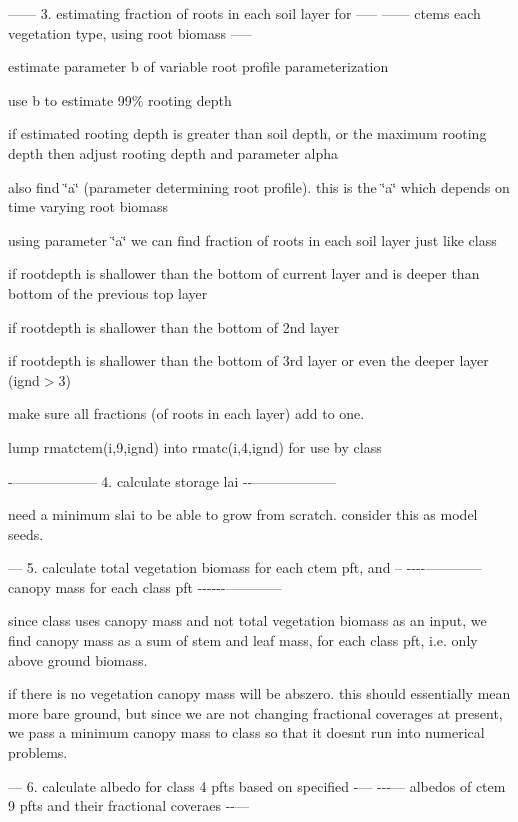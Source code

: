 ------ 3. estimating fraction of roots in each soil layer for ----- ------ ctem\textquotesingle{}s each vegetation type, using root biomass -----

estimate parameter b of variable root profile parameterization

use b to estimate 99\% rooting depth

if estimated rooting depth is greater than soil depth, or the maximum rooting depth then adjust rooting depth and parameter alpha

also find \char`\"{}a\char`\"{} (parameter determining root profile). this is the \char`\"{}a\char`\"{} which depends on time varying root biomass

using parameter \char`\"{}a\char`\"{} we can find fraction of roots in each soil layer just like class

if rootdepth is shallower than the bottom of current layer and is deeper than bottom of the previous top layer

if rootdepth is shallower than the bottom of 2nd layer

if rootdepth is shallower than the bottom of 3rd layer or even the deeper layer (ignd$>$3)

make sure all fractions (of roots in each layer) add to one.

lump rmatctem(i,9,ignd) into rmatc(i,4,ignd) for use by class

-\/------------------ 4. calculate storage lai -\/-\/------------------

need a minimum slai to be able to grow from scratch. consider this as model seeds.

--- 5. calculate total vegetation biomass for each ctem pft, and -- -\/-\/-\/-\/------------ canopy mass for each class pft -\/-\/-\/-\/-\/-\/------------

since class uses canopy mass and not total vegetation biomass as an input, we find canopy mass as a sum of stem and leaf mass, for each class pft, i.\+e. only above ground biomass.

if there is no vegetation canopy mass will be abszero. this should essentially mean more bare ground, but since we are not changing fractional coverages at present, we pass a minimum canopy mass to class so that it doesn\textquotesingle{}t run into numerical problems.

--- 6. calculate albedo for class\textquotesingle{} 4 pfts based on specified -\/--- -\/-\/-\/--- albedos of ctem 9 pfts and their fractional coveraes -\/-\/---